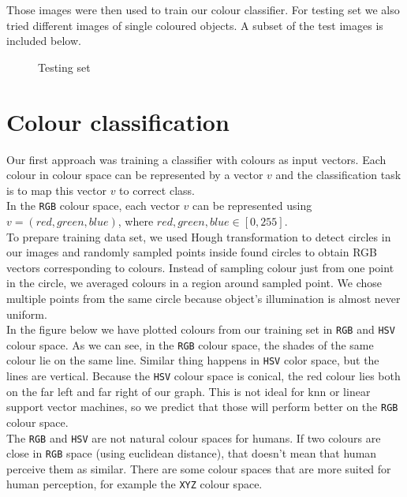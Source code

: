 \documentclass[12pt,a4paper]{article}
\begin{document}
	Those images were then used to train our colour classifier. For testing set we also tried different images of single coloured objects. A subset of the test images is included below.
	
	\begin{figure}[H]
		\centering
		\caption{Testing set}
	\end{figure}
	
	\section{Colour classification}
	
	Our first approach was training a classifier with colours as input vectors. Each colour in colour space can be represented by a vector $v$ and the classification task is to map this vector $v$ to correct class. \\
	
	In the \texttt{RGB} colour space, each vector $v$ can be represented using $v = (red, green, blue)$, where $red, green, blue \in [0, 255]$. \\
	
	To prepare training data set, we used Hough transformation to detect circles in our images and randomly sampled points inside found circles to obtain RGB vectors corresponding to colours. Instead of sampling colour just from one point in the circle, we averaged colours in a region around sampled point. We chose multiple points from the same circle because object's illumination is almost never uniform. \\
	
	In the figure below we have plotted colours from our training set in \texttt{RGB} and \texttt{HSV} colour space. As we can see, in the \texttt{RGB} colour space, the shades of the same colour lie on the same line. Similar thing happens in \texttt{HSV} color space, but the lines are vertical. Because the \texttt{HSV} colour space is conical, the red colour lies both on the far left and far right of our graph. This is not ideal for knn or linear support vector machines, so we predict that those will perform better on the \texttt{RGB} colour space. \\
	
	The \texttt{RGB} and \texttt{HSV} are not natural colour spaces for humans. If two colours are close in \texttt{RGB} space (using euclidean distance), that doesn't mean that human perceive them as similar. There are some colour spaces that are more suited for human perception, for example the \texttt{XYZ} colour space. \\
	
\end{document}
